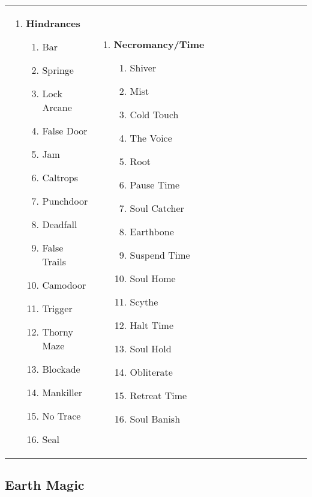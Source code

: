 \begin{tabular}{@{} p{0.25\linewidth} p{0.25\linewidth} p{0.25\linewidth} p{0.25\linewidth}}
\begin{enumerate}
	\item \textbf{Hindrances}
	\begin{enumerate}
		\item Bar
		\item Springe
		\item Lock Arcane
		\item False Door
		\item Jam
		\item Caltrops
		\item Punchdoor
		\item Deadfall
		\item False Trails
		\item Camodoor
		\item Trigger
		\item Thorny Maze
		\item Blockade
		\item Mankiller
		\item No Trace
		\item Seal
	\end{enumerate}
\end{enumerate} &
\begin{enumerate}
	\item \textbf{Necromancy/Time}
	\begin{enumerate}
		\item Shiver
		\item Mist
		\item Cold Touch
		\item The Voice
		\item Root
		\item Pause Time
		\item Soul Catcher
		\item Earthbone
		\item Suspend Time
		\item Soul Home
		\item Scythe
		\item Halt Time
		\item Soul Hold
		\item Obliterate
		\item Retreat Time
		\item Soul Banish
	\end{enumerate}
\end{enumerate} \\
\end{tabular}
\pagebreak
\subsection{Earth Magic}

